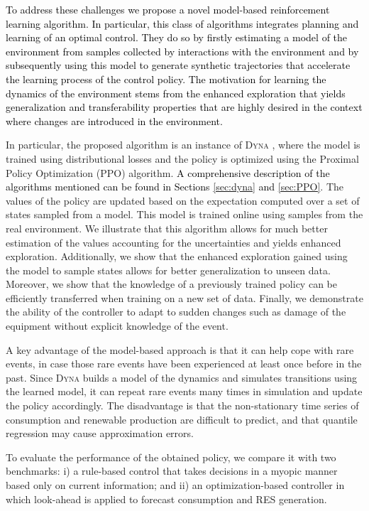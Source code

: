 \documentclass{article}
\begin{document}
	\textcolor{black}{To address these challenges we propose a novel model-based reinforcement learning algorithm. In particular, this class of algorithms integrates planning and learning of an optimal control. They do so by firstly estimating a model of the environment from samples collected by interactions with the environment and by subsequently using this model to generate synthetic trajectories that accelerate the learning process of the control policy. The motivation for learning the dynamics of the environment stems from the enhanced exploration that yields generalization and transferability properties that are highly desired in the context where changes are introduced in the environment.}
	
	In particular, the proposed algorithm is an instance of \textsc{Dyna} \cite{sutton2012dyna}, where the model is trained using distributional losses and the policy is optimized using the Proximal Policy Optimization (PPO) algorithm. \textcolor{black}{A comprehensive description of the algorithms mentioned can be found in Sections \ref{sec:dyna} and \ref{sec:PPO}}. The values of the policy are updated based on the expectation computed over a set of states sampled from a model. This model is trained online using samples from the real environment. We illustrate that this algorithm allows for much better estimation of the values accounting for the uncertainties and yields enhanced exploration. Additionally, we show that the enhanced exploration gained using the model to sample states allows for better generalization to unseen data. Moreover, we show that the knowledge of a previously trained policy can be efficiently transferred when training on a new set of data. Finally, we demonstrate the ability of the controller to adapt to sudden changes such as damage of the equipment without explicit knowledge of the event. 

	A key advantage of the model-based approach is that it can help cope with rare events, in case those rare events have been experienced at least once before in the past. Since \textsc{Dyna} builds a model of the dynamics and simulates transitions using the learned model, it can repeat rare events many times in simulation and update the policy accordingly. The disadvantage is that the non-stationary time series of consumption and renewable production are difficult to predict, and that quantile regression may cause approximation errors.

	To evaluate the performance of the obtained policy, we compare it with two benchmarks: i) a rule-based control that takes decisions in a myopic manner based only on current information; and ii) an optimization-based controller in which look-ahead is applied to forecast consumption and RES generation.
\end{document}
